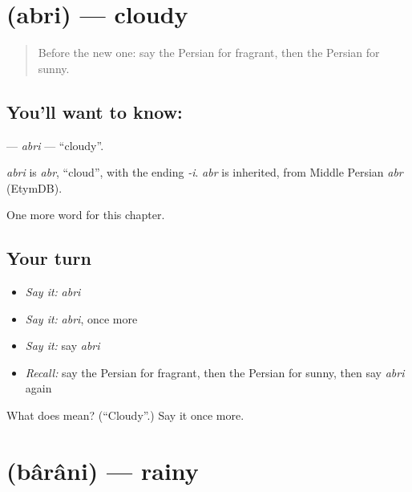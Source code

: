 \section[\texorpdfstring{\fa{ابری} (abri)}{ابری (abri)}]{ (abri) — cloudy}

\label{lesson:FA-C201-abri}



\begin{quote}
Before the new one: say the Persian for fragrant, then the Persian for sunny.
\end{quote}

\subsection*{You'll want to know: }
\textbf{} — \emph{abri} — \textquotedblleft{}cloudy\textquotedblright{}.

\begin{cousinweb}
\emph{abri} is \emph{abr}, \textquotedblleft{}cloud\textquotedblright{}, with the ending \emph{-i}. \emph{abr} is inherited, from Middle Persian \emph{abr} (EtymDB).
\end{cousinweb}

\begin{grammarlens}[title={What you've built}]
One more word for this chapter.
\end{grammarlens}

\subsection*{Your turn}
\begin{itemize}
\raggedright
  \item \emph{Say it:} \emph{abri}
  \item \emph{Say it:} \emph{abri}, once more
  \item \emph{Say it:} say \emph{abri}
  \item \emph{Recall:} say the Persian for fragrant, then the Persian for sunny, then say \emph{abri} again
\end{itemize}

\begin{tcolorbox}[breakable,colback=teal!4,colframe=teal!35!black,title={Before you move on}]
What does  mean? (\textquotedblleft{}Cloudy\textquotedblright{}.) Say it once more.
\end{tcolorbox}
\section[\texorpdfstring{\fa{بارانی} (bârâni)}{بارانی (bârâni)}]{ (bârâni) — rainy}

